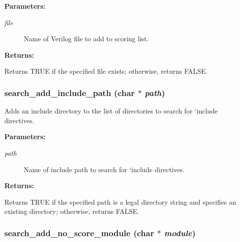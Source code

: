 \begin{Desc}
\item[{\bf Parameters: }]\par
\begin{description}
\item[
{\em file}]Name of Verilog file to add to scoring list. \end{description}
\end{Desc}
\begin{Desc}
\item[{\bf Returns: }]\par
Returns TRUE if the specified file exists; otherwise, returns FALSE. \end{Desc}
\subsubsection{ search\_\-add\_\-include\_\-path (char $\ast$ {\em path})}\label{search_8h_a1}


Adds an include directory to the list of directories to search for `include directives.

\begin{Desc}
\item[{\bf Parameters: }]\par
\begin{description}
\item[
{\em path}]Name of include path to search for `include directives. \end{description}
\end{Desc}
\begin{Desc}
\item[{\bf Returns: }]\par
Returns TRUE if the specified path is a legal directory string and specifies an existing directory; otherwise, returns FALSE. \end{Desc}
\subsubsection{ search\_\-add\_\-no\_\-score\_\-module (char $\ast$ {\em module})}\label{search_8h_a4}



